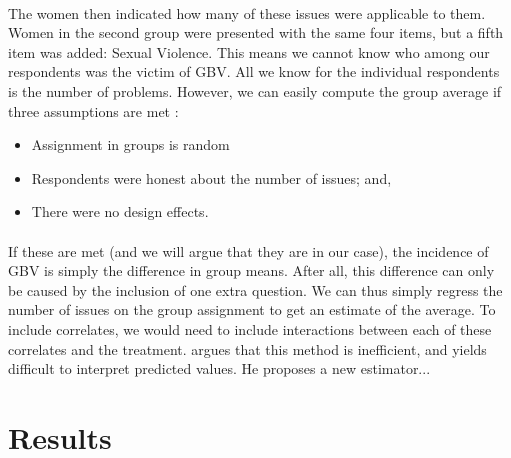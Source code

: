\documentclass[11pt,a4paper]{scrartcl} %
\begin{document}
\paragraph{}
The women then indicated how many of these issues were applicable to them. Women in the second group were presented with the same four items, but a fifth item was added: Sexual Violence. This means we cannot know who among our respondents was the victim of GBV. All we know for the individual respondents is the number of problems. However, we can easily compute the group average if three assumptions are met \cite{Tsai2019}:
\begin{itemize}
	\item Assignment in groups is random
	\item Respondents were honest about the number of issues; and,
	\item There were no design effects.
\end{itemize}

\paragraph{}
If these are met (and we will argue that they are in our case), the incidence of GBV is simply the difference in group means. After all, this difference can only be caused by the inclusion of one extra question. We can thus simply regress the number of issues on the group assignment to get an estimate of the average. To include correlates, we would need to include interactions between each of these correlates and the treatment. \cite{Imai2011} argues that this method is inefficient, and yields difficult to interpret predicted values. He proposes a new estimator...



\section*{Results}
\end{document}
